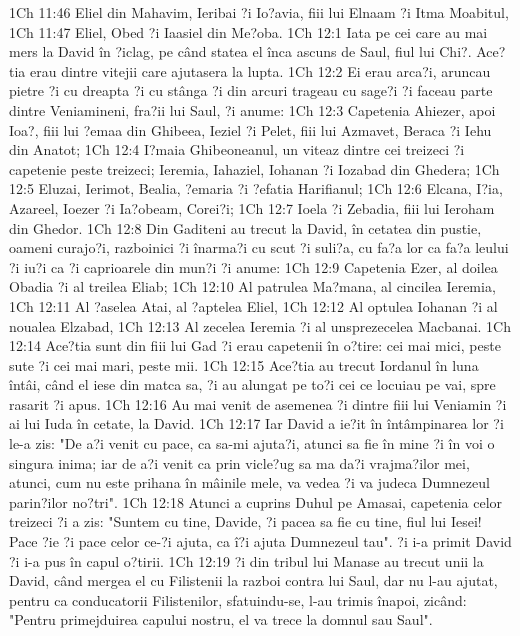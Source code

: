 1Ch 11:46  Eliel din Mahavim, Ieribai ?i Io?avia, fiii lui Elnaam ?i Itma Moabitul,
1Ch 11:47  Eliel, Obed ?i Iaasiel din Me?oba.
1Ch 12:1  Iata pe cei care au mai mers la David în ?iclag, pe când statea el înca ascuns de Saul, fiul lui Chi?. Ace?tia erau dintre vitejii care ajutasera la lupta.
1Ch 12:2  Ei erau arca?i, aruncau pietre ?i cu dreapta ?i cu stânga ?i din arcuri trageau cu sage?i ?i faceau parte dintre Veniamineni, fra?ii lui Saul, ?i anume:
1Ch 12:3  Capetenia Ahiezer, apoi Ioa?, fiii lui ?emaa din Ghibeea, Ieziel ?i Pelet, fiii lui Azmavet, Beraca ?i Iehu din Anatot;
1Ch 12:4  I?maia Ghibeoneanul, un viteaz dintre cei treizeci ?i capetenie peste treizeci; Ieremia, Iahaziel, Iohanan ?i Iozabad din Ghedera;
1Ch 12:5  Eluzai, Ierimot, Bealia, ?emaria ?i ?efatia Harifianul;
1Ch 12:6  Elcana, I?ia, Azareel, Ioezer ?i Ia?obeam, Corei?i;
1Ch 12:7  Ioela ?i Zebadia, fiii lui Ieroham din Ghedor.
1Ch 12:8  Din Gaditeni au trecut la David, în cetatea din pustie, oameni curajo?i, razboinici ?i înarma?i cu scut ?i suli?a, cu fa?a lor ca fa?a leului ?i iu?i ca ?i caprioarele din mun?i ?i anume:
1Ch 12:9  Capetenia Ezer, al doilea Obadia ?i al treilea Eliab;
1Ch 12:10  Al patrulea Ma?mana, al cincilea Ieremia,
1Ch 12:11  Al ?aselea Atai, al ?aptelea Eliel,
1Ch 12:12  Al optulea Iohanan ?i al noualea Elzabad,
1Ch 12:13  Al zecelea Ieremia ?i al unsprezecelea Macbanai.
1Ch 12:14  Ace?tia sunt din fiii lui Gad ?i erau capetenii în o?tire: cei mai mici, peste sute ?i cei mai mari, peste mii.
1Ch 12:15  Ace?tia au trecut Iordanul în luna întâi, când el iese din matca sa, ?i au alungat pe to?i cei ce locuiau pe vai, spre rasarit ?i apus.
1Ch 12:16  Au mai venit de asemenea ?i dintre fiii lui Veniamin ?i ai lui Iuda în cetate, la David.
1Ch 12:17  Iar David a ie?it în întâmpinarea lor ?i le-a zis: "De a?i venit cu pace, ca sa-mi ajuta?i, atunci sa fie în mine ?i în voi o singura inima; iar de a?i venit ca prin vicle?ug sa ma da?i vrajma?ilor mei, atunci, cum nu este prihana în mâinile mele, va vedea ?i va judeca Dumnezeul parin?ilor no?tri".
1Ch 12:18  Atunci a cuprins Duhul pe Amasai, capetenia celor treizeci ?i a zis: "Suntem cu tine, Davide, ?i pacea sa fie cu tine, fiul lui Iesei! Pace ?ie ?i pace celor ce-?i ajuta, ca î?i ajuta Dumnezeul tau". ?i i-a primit David ?i i-a pus în capul o?tirii.
1Ch 12:19  ?i din tribul lui Manase au trecut unii la David, când mergea el cu Filistenii la razboi contra lui Saul, dar nu l-au ajutat, pentru ca conducatorii Filistenilor, sfatuindu-se, l-au trimis înapoi, zicând: "Pentru primejduirea capului nostru, el va trece la domnul sau Saul".
